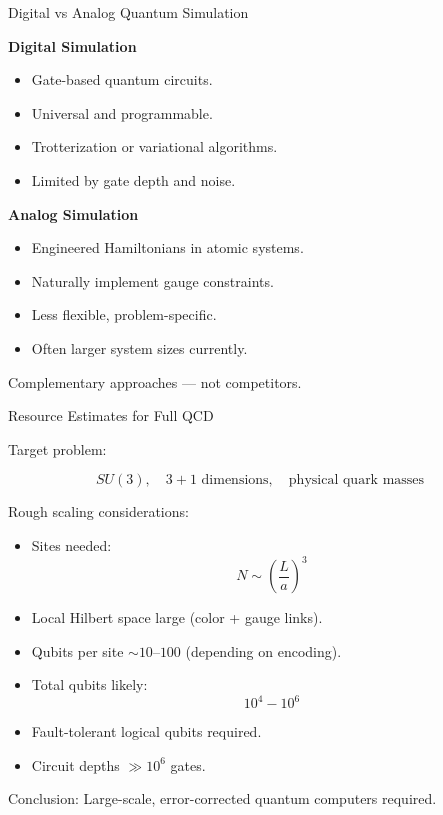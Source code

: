 \documentclass[11pt]{beamer}
\begin{document}
\begin{frame}{Digital vs Analog Quantum Simulation}

\textbf{Digital Simulation}
\begin{itemize}
\item Gate-based quantum circuits.
\item Universal and programmable.
\item Trotterization or variational algorithms.
\item Limited by gate depth and noise.
\end{itemize}

\bigskip

\textbf{Analog Simulation}
\begin{itemize}
\item Engineered Hamiltonians in atomic systems.
\item Naturally implement gauge constraints.
\item Less flexible, problem-specific.
\item Often larger system sizes currently.
\end{itemize}

\bigskip

Complementary approaches — not competitors.
\end{frame}

\begin{frame}{Resource Estimates for Full QCD}

Target problem:

\[
SU(3),\quad 3+1 \text{ dimensions},\quad \text{physical quark masses}
\]

Rough scaling considerations:

\begin{itemize}
\item Sites needed:
\[
N \sim \left(\frac{L}{a}\right)^3
\]
\item Local Hilbert space large (color + gauge links).
\item Qubits per site $\sim 10$–$100$ (depending on encoding).
\item Total qubits likely:
\[
10^4 - 10^6
\]
\item Fault-tolerant logical qubits required.
\item Circuit depths $\gg 10^6$ gates.
\end{itemize}

Conclusion:
Large-scale, error-corrected quantum computers required.
\end{frame}
\end{document}

